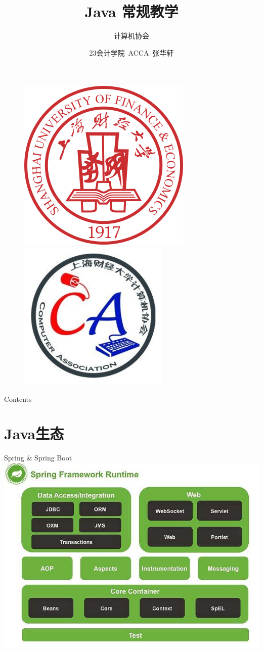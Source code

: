 \documentclass[UTF8, 16pt]{beamer}
\author[计算机协会] %
{
计算机协会
}
\title[Java 常规教学]{Java 常规教学}
\subtitle{}
\institute[SUFE]
{
上海财经大学
}
\date{23会计学院\ ACCA\ 张华轩}
\begin{document}
\begin{frame}[noframenumbering]
    \titlepage{}
    \vspace{-0.5cm}
    \begin{figure}[htpb]
        \begin{center}
            \includegraphics[width=0.19 \linewidth]{sufe_logo.png}
            \quad
            \includegraphics[width=0.19 \linewidth]{ca_logo.png}
        \end{center}
    \end{figure}
\end{frame}

\begin{frame}{Contents}
    \tableofcontents[sectionstyle=show,
        subsectionstyle=show/shaded/hide,
        subsubsectionstyle=show/shaded/hide]
\end{frame}

\section{Java生态}
\begin{frame}
    \centering
    \textcolor{sufered}{Spring \& Spring Boot}
    \includegraphics[width=0.95\linewidth]{ch1/spring.png}
\end{frame}
\end{document}
